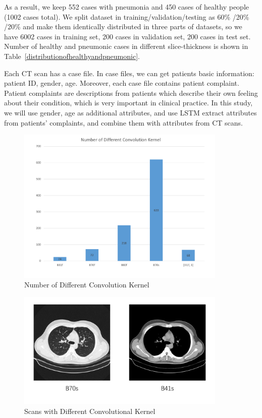 \documentclass[runningheads]{llncs}
\begin{document}
As a result, we keep 552 cases with pneumonia and 450 cases of healthy people (1002 cases total).
We split dataset in training/validation/testing as 60\% /20\% /20\% and make them identically distributed in three parts of datasets, so we have 6002 cases in training set, 200 cases in validation set, 200 cases in test set.
Number of healthy and pneumonic cases in different slice-thickness is shown in Table~\ref{distributionofhealthyandpneumonic}.

Each CT scan has a case file. In case files, we can get patients basic information: patient ID, gender, age. Moreover, each case file contains patient complaint. Patient complaints are descriptions from patients which describe their own feeling about their condition, which is very important in clinical practice. In this study, we will use gender, age as additional attributes, and use LSTM extract attributes from patients' complaints, and combine them with attributes from CT scans.

\begin{figure}[t]
\centerline{\includegraphics[width=100mm]{NumberofDifferentConvolutionKernel.pdf}}
\vspace{-0cm}
\caption{Number of Different Convolution Kernel}
\vspace{-0cm}
\label{NumberofDifferentConvolutionKernel}
\end{figure}

\begin{figure}[t]
    \centerline{\includegraphics[width=100mm]{Bs.pdf}}
    \vspace{-0cm}
    \caption{Scans with Different Convolutional Kernel}
    \vspace{-0cm}
    \label{Bs}
    \end{figure}
\end{document}
